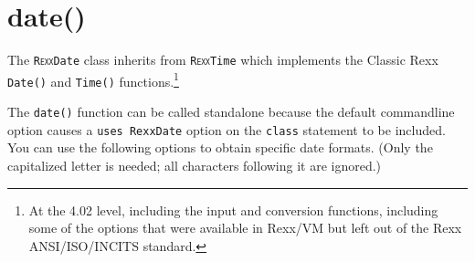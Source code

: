 \section{date()}\label{refrexxdate}
 
The \texttt{R\textsc{exx}Date} class inherits from
\texttt{R\textsc{exx}Time} which implements the Classic
Rexx \texttt{Date()} and \texttt{Time()} functions.\footnote{At the
  4.02 level, including the input and conversion functions, including
some of the options that were available in Rexx/VM but left out of the
Rexx ANSI/ISO/INCITS standard.}

  

The \texttt{date()} function can be called standalone because the
default commandline option  causes a \texttt{uses RexxDate}
option on the \texttt{class} statement to be included. You can use the following options to obtain specific date formats. (Only the capitalized letter is needed; all characters following it are ignored.)
